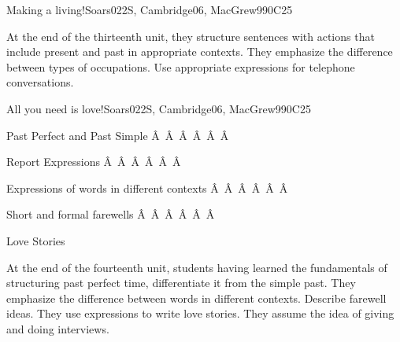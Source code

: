 \begin{syllabus}
\begin{unit}{Making a living!}{}{Soars022S, Cambridge06, MacGrew99}{0}{C25}
   \begin{learningoutcomes}
      \item At the end of the thirteenth unit, they structure sentences with actions that include present and past in appropriate contexts. They emphasize the difference between types of occupations. Use appropriate expressions for telephone conversations.
   \end{learningoutcomes}
\end{unit}

\begin{unit}{All you need is love!}{}{Soars022S, Cambridge06, MacGrew99}{0}{C25}
   \begin{topics}
       \item Past Perfect and Past Simple
Â Â Â Â Â Â  \item Report Expressions
Â Â Â Â Â Â  \item Expressions of words in different contexts
Â Â Â Â Â Â  \item Short and formal farewells
Â Â Â Â Â Â  \item Love Stories
   \end{topics}

   \begin{learningoutcomes}
      \item At the end of the fourteenth unit, students having learned the fundamentals of structuring past perfect time, differentiate it from the simple past. They emphasize the difference between words in different contexts. Describe farewell ideas. They use expressions to write love stories. They assume the idea of giving and doing interviews.
   \end{learningoutcomes}
\end{unit}

\begin{coursebibliography}
\end{coursebibliography}

\end{syllabus}
%
